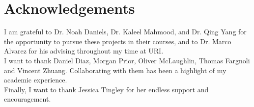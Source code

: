 \section{Acknowledgements}

I am grateful to Dr. Noah Daniels, Dr. Kaleel Mahmood, and Dr. Qing Yang for the opportunity to pursue these projects in their courses, and to Dr. Marco Alvarez
for his advising throughout my time at URI. \\

\noindent
I want to thank Daniel Diaz, Morgan Prior, Oliver McLaughlin, Thomas Fargnoli and Vincent Zhuang. Collaborating with them has been a highlight of my academic 
experience. \\

\noindent
Finally, I want to thank Jessica Tingley for her endless support and encouragement.